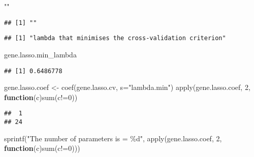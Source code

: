 \documentclass[
]{article}
\newenvironment{Shaded}{\begin{snugshade}}{\end{snugshade}}
\newcommand{\AttributeTok}[1]{\textcolor[rgb]{0.77,0.63,0.00}{#1}}
\newcommand{\ControlFlowTok}[1]{\textcolor[rgb]{0.13,0.29,0.53}{\textbf{#1}}}
\newcommand{\DecValTok}[1]{\textcolor[rgb]{0.00,0.00,0.81}{#1}}
\newcommand{\FunctionTok}[1]{\textcolor[rgb]{0.00,0.00,0.00}{#1}}
\newcommand{\NormalTok}[1]{#1}
\newcommand{\OtherTok}[1]{\textcolor[rgb]{0.56,0.35,0.01}{#1}}
\newcommand{\SpecialCharTok}[1]{\textcolor[rgb]{0.00,0.00,0.00}{#1}}
\newcommand{\StringTok}[1]{\textcolor[rgb]{0.31,0.60,0.02}{#1}}
\begin{document}
\begin{Shaded}
\begin{Highlighting}[]
\StringTok{""}
\end{Highlighting}
\end{Shaded}

\begin{verbatim}
## [1] ""
\end{verbatim}

\begin{Shaded}
\end{Shaded}

\begin{verbatim}
## [1] "lambda that minimises the cross-validation criterion"
\end{verbatim}

\begin{Shaded}
\begin{Highlighting}[]
\NormalTok{gene.lasso.min\_lambda}
\end{Highlighting}
\end{Shaded}

\begin{verbatim}
## [1] 0.6486778
\end{verbatim}

\begin{Shaded}
\begin{Highlighting}[]
\NormalTok{gene.lasso.coef }\OtherTok{\textless{}{-}} \FunctionTok{coef}\NormalTok{(gene.lasso.cv, }\AttributeTok{s=}\StringTok{"lambda.min"}\NormalTok{)}
\FunctionTok{apply}\NormalTok{(gene.lasso.coef, }\DecValTok{2}\NormalTok{, }\ControlFlowTok{function}\NormalTok{(c)}\FunctionTok{sum}\NormalTok{(c}\SpecialCharTok{!=}\DecValTok{0}\NormalTok{))}
\end{Highlighting}
\end{Shaded}

\begin{verbatim}
##  1 
## 24
\end{verbatim}

\begin{Shaded}
\begin{Highlighting}[]
\FunctionTok{sprintf}\NormalTok{(}\StringTok{"The number of parameters is = \%d"}\NormalTok{, }\FunctionTok{apply}\NormalTok{(gene.lasso.coef, }\DecValTok{2}\NormalTok{, }\ControlFlowTok{function}\NormalTok{(c)}\FunctionTok{sum}\NormalTok{(c}\SpecialCharTok{!=}\DecValTok{0}\NormalTok{)))}
\end{Highlighting}
\end{Shaded}
\end{document}
